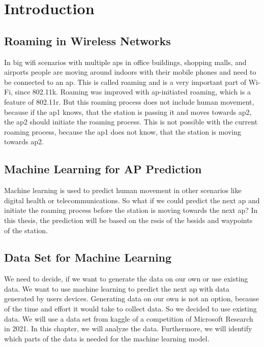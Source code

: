 \chapter{Introduction}\label{sec:intro}



\section{Roaming in Wireless Networks}
In big \ac{wifi} scenarios with multiple \acp{ap} in office buildings, shopping malls, and airports people are moving around indoors with their mobile phones and need to be connected to an \ac{ap}.
This is called roaming and is a very important part of Wi-Fi, since 802.11k\cite{802.11k}.
Roaming was improved with \ac{ap}-initiated roaming, which is a feature of 802.11r\cite{802.11r}.
But this roaming process does not include human movement, because if the \ac{ap}1 knows, that the station is passing it and moves towards \ac{ap}2, the \ac{ap}2 should initiate the roaming process.
This is not possible with the current roaming process, because the \ac{ap}1 does not know, that the station is moving towards \ac{ap}2.

\section{Machine Learning for AP Prediction}
Machine learning is used to predict human movement in other scenarios like digital health or telecommunications.
So what if we could predict the next \ac{ap} and initiate the roaming process before the station is moving towards the next \ac{ap}?
In this thesis, the prediction will be based on the \acp{rssi} of the \acp{bssid} and waypoints of the station.

\section{Data Set for Machine Learning} \label{sec:intro-dataset}
We need to decide, if we want to generate the data on our own or use existing data.
We want to use machine learning to predict the next \ac{ap} with data generated by users devices.
Generating data on our own is not an option, because of the time and effort it would take to collect data.
So we decided to use existing data.
We will use a data set from kaggle\cite{kaggle} of a competition of Microsoft Research in 2021\cite{IndoorLocationNavigation}.
In this chapter, we will analyze the data.
Furthermore, we will identify which parts of the data is needed for the machine learning model.

